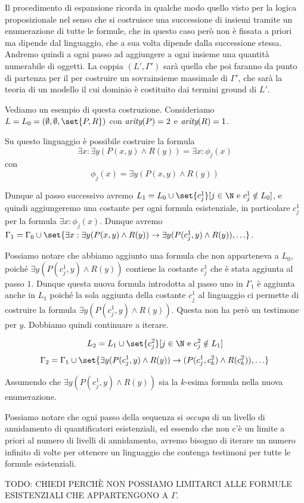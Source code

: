 Il procedimento di espansione ricorda in qualche modo quello visto per la logica proposizionale nel senso che si costruisce una successione di insiemi tramite un enumerazione di tutte le formule, che in questo caso però non è fissata a priori ma dipende dal linguaggio, che a sua volta dipende dalla successione stessa. Andremo quindi a ogni passo ad aggiungere a ogni insieme una quantità numerabile di oggetti. La coppia \((L',\Gamma')\) sarà quella che poi faranno da punto di partenza per il  per costruire un sovrainsieme massimale di \(\Gamma'\), che sarà la teoria di un modello il cui dominio è costituito dai termini ground di \(L'\).

\begin{example}{}
  Vediamo un esempio di questa costruzione. Consideriamo \(L = L_0 = (\emptyset, \emptyset,\set{P,R})\) con \(\operatorname{\textit{arity}}(P) = 2\) e \(\operatorname{\textit{arity}}(R) = 1\).

  Su questo linguaggio è possibile costruire la formula
  \[\exists x:\exists y (P(x,y) \land R(y)) = \exists x: \phi_j(x)\]
  con
  \[\phi_j(x) = \exists y (P(x,y) \land R(y))\]

  Dunque al passo successivo avremo \(L_1 = L_0 \cup \set{c_j^1}[j \in \N \text{ e } c_j^1 \notin L_0]\), e quindi aggiungeremo una costante per ogni formula esistenziale, in particolare \(c_j^1\) per la formula \(\exists x: \phi_j(x)\). Dunque avremo \(\Gamma_1 = \Gamma_0 \cup \set{\exists x: \exists y (P(x,y) \land R(y)) \to \exists y (P(c_j^1,y) \land R(y)), \ldots} \).

  Possiamo notare che abbiamo aggiunto una formula che non apparteneva a \(L_0\), poiché \(\exists y (P(c_j^1,y) \land R(y))\) contiene la costante \(c_j^1\) che è stata aggiunta al passo \(1\). Dunque questa nuova formula introdotta al passo uno in \(\Gamma_1\) è aggiunta anche in \(L_1\) poiché la sola aggiunta della costante \(c_j^1\) al linguaggio ci permette di costruire la formula \(\exists y (P(c_j^1,y) \land R(y))\). Questa non ha però un testimone per \(y\). Dobbiamo quindi continuare a iterare.

  \[L_2 = L_1 \cup \set{c_j^2}[j \in \N \text{ e } c_j^2 \notin L_1]\]
  \[\Gamma_2 = \Gamma_1 \cup \set{\exists y (P(c_j^1,y) \land R(y)) \to (P(c_j^1,c_k^2) \land R(c_k^2)), \ldots}\]

  Assumendo che \(\exists y (P(c_j^1,y) \land R(y))\) sia la \(k\)-esima formula nella nuova enumerazione.

  Possiamo notare che ogni passo della sequenza si \textit{occupa} di un livello di annidamento di quantificatori esistenziali, ed essendo che non c'è un limite a priori al numero di livelli di annidamento, avremo bisogno di iterare un numero infinito di volte per ottenere un linguaggio che contenga testimoni per tutte le formule esistenziali.

  TODO\@: CHIEDI PERCHÈ NON POSSIAMO LIMITARCI ALLE FORMULE ESISTENZIALI CHE APPARTENGONO A \(\Gamma\).
\end{example}

